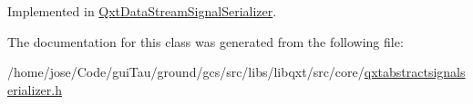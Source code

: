 Implemented in \hyperlink{class_qxt_data_stream_signal_serializer_a6e86a392da2a0e8d294c1c0ee4054de5}{Qxt\-Data\-Stream\-Signal\-Serializer}.



The documentation for this class was generated from the following file\-:\begin{DoxyCompactItemize}
\item 
/home/jose/\-Code/gui\-Tau/ground/gcs/src/libs/libqxt/src/core/\hyperlink{qxtabstractsignalserializer_8h}{qxtabstractsignalserializer.\-h}\end{DoxyCompactItemize}
